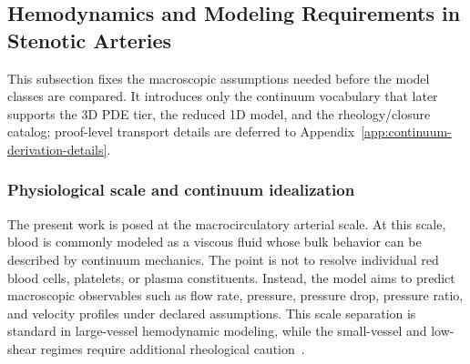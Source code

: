 \subsection{Hemodynamics and Modeling Requirements in Stenotic Arteries}
\label{subsec:continuum-constitutive-assumptions}

This subsection fixes the macroscopic assumptions needed before the model
classes are compared. It introduces only the continuum vocabulary that later
supports the 3D PDE tier, the reduced 1D model, and the rheology/closure
catalog; proof-level transport details are deferred to
Appendix~\ref{app:continuum-derivation-details}.

\subsubsection{Physiological scale and continuum idealization}
\label{subsubsec:physiological-scale-boundary}

The present work is posed at the macrocirculatory arterial scale.
At this scale, blood is commonly modeled as a viscous fluid whose bulk behavior
can be described by continuum mechanics. The point is not to resolve individual
red blood cells, platelets, or plasma constituents. Instead, the model aims to
predict macroscopic observables such as flow rate, pressure, pressure drop,
pressure ratio, and velocity profiles under declared assumptions.
This scale separation is standard in large-vessel hemodynamic modeling, while the
small-vessel and low-shear regimes require additional rheological
caution~\cite{KopplHelmig2023DimensionReducedModeling,GaldiEtAl2008HemodynamicalFlows,PriesEtAl1992BloodViscosityTubeFlow}.

